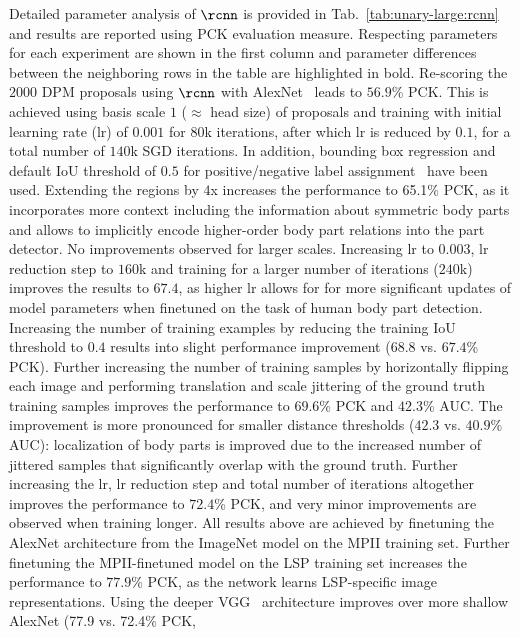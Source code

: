  Detailed
parameter analysis of $\rcnn$ is provided in
Tab.~\ref{tab:unary-large:rcnn} and results are reported using PCK
evaluation measure. Respecting parameters for each experiment are
shown in the first column and parameter differences between the
neighboring rows in the table are highlighted in bold. Re-scoring the
$2000$ DPM proposals using $\rcnn$ with
AlexNet~\cite{krizhevsky12nips} leads to $56.9$\% PCK. This is
achieved using basis scale $1$ ($\approx$ head size) of proposals and
training with initial learning rate (lr) of $0.001$ for $80$k
iterations, after which lr is reduced by $0.1$, for a total number of
$140$k SGD iterations. In addition, bounding box regression and
default IoU threshold of $0.5$ for positive/negative label
assignment~\cite{girshickICCV15fastrcnn} have been used. Extending the
regions by $4$x increases the performance to 65.1\% PCK, as it
incorporates more context including the information about symmetric
body parts and allows to implicitly encode higher-order body part
relations into the part detector. No improvements observed for larger
scales. Increasing lr to $0.003$, lr reduction step to $160$k and
training for a larger number of iterations ($240$k) improves the
results to $67.4$, as higher lr allows for for more significant
updates of model parameters when finetuned on the task of human body
part detection. Increasing the number of training examples by reducing
the training IoU threshold to $0.4$ results into slight performance
improvement ($68.8$ vs. $67.4$\% PCK). Further increasing the number
of training samples by horizontally flipping each image and performing
translation and scale jittering of the ground truth training samples
improves the performance to $69.6$\% PCK and $42.3$\% AUC. The
improvement is more pronounced for smaller distance thresholds ($42.3$
vs. $40.9$\% AUC): localization of body parts is improved due to the
increased number of jittered samples that significantly overlap with
the ground truth. Further increasing the lr, lr reduction step and
total number of iterations altogether improves the performance to
$72.4$\% PCK, and very minor improvements are observed when training
longer. All results above are achieved by finetuning the AlexNet
architecture from the ImageNet model on the MPII training set. Further
finetuning the MPII-finetuned model on the LSP training set increases
the performance to $77.9$\% PCK, as the network learns LSP-specific
image representations. Using the deeper VGG~\cite{Simonyan14c}
architecture improves over more shallow AlexNet (77.9 vs. 72.4\% PCK,
